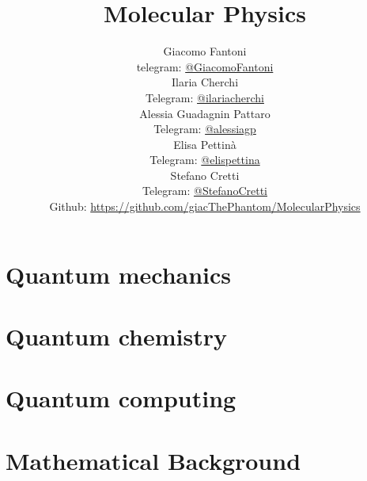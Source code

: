 

\title{\Huge \textbf{Molecular Physics}}

\author{
  Giacomo Fantoni \\
  \small telegram: \href{https://t.me/GiacomoFantoni}{@GiacomoFantoni} \\[3pt]
  Ilaria Cherchi\\
  \small Telegram: \href{https://t.me/ilariacherchi}{@ilariacherchi} \\[3pt]
  Alessia Guadagnin Pattaro\\
  \small Telegram: \href{https://t.me/alessiagp}{@alessiagp} \\[3pt]
  Elisa Pettin\`a\\
  \small Telegram: \href{https://t.me/elisapettina}{@elispettina} \\[3pt]
  Stefano Cretti\\
  \small Telegram: \href{https://t.me/StefanoCretti}{@StefanoCretti} \\[3pt]
\small Github: \href{https://github.com/giacThePhantom/MolecularPhysics}{https://github.com/giacThePhantom/MolecularPhysics}}


\maketitle
\tableofcontents

  \part{Quantum mechanics}

    
    
    
    

  \part{Quantum chemistry}

    
    
    

  \part{Quantum computing}

   

  \part{Mathematical Background}

    
    
    
    
    
    
    
    



